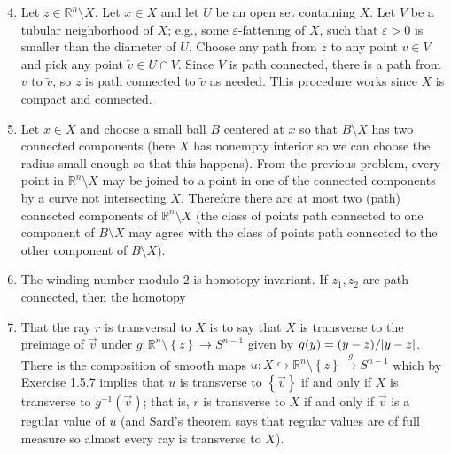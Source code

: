 \documentclass[11pt,leqno]{article}
\theoremstyle{plain}
\theoremstyle{definition}
\numberwithin{equation}{section}
\numberwithin{lem}{section}
\newcommand{\cbr}[1]{\left\{#1\right\}}
\begin{document}
\begin{enumerate}
    \setcounter{enumi}{3}
    \item Let $z\in \mathbb R^n\setminus X$. Let $x\in X$ and let $U$ be an open set containing $X$. Let $V$ be a tubular neighborhood of $X$; e.g., some $\varepsilon$-fattening of $X$, such that $\varepsilon>0$ is smaller than the diameter of $U$. Choose any path from $z$ to any point $v\in V$ and pick any point $\tilde v \in U\cap V$. Since $V$ is path connected, there is a path from $v$ to $\tilde v$, so $z$ is path connected to $\tilde v$ as needed. This procedure works since $X$ is compact and connected.
    \item Let $x\in X$ and choose a small ball $B$ centered at $x$ so that $B\setminus X$ has two connected components (here $X$ has nonempty interior so we can choose the radius small enough so that this happens). From the previous problem, every point in $\mathbb R^n\setminus X$ may be joined to a point in one of the connected components by a curve not intersecting $X$. Therefore there are at most two (path) connected components of $\mathbb R^n\setminus X$ (the class of points path connected to one component of $B\setminus X$ may agree with the class of points path connected to the other component of $B\setminus X$).
    \item The winding number modulo $2$ is homotopy invariant. If $z_1,z_2$ are path connected, then the homotopy 
    \item That the ray $r$ is transversal to $X$ is to say that $X$ is transverse to the preimage of $\vec v$ under $g\colon \mathbb R^n\setminus\cbr{z}\to S^{n-1}$ given by $g(y) = (y-z)/\abs{y-z}$. There is the composition of smooth maps $u\colon X\hookrightarrow \mathbb R^n\setminus\cbr{z}\xrightarrow{g}S^{n-1}$ which by Exercise 1.5.7 implies that $u$ is transverse to $\cbr{\vec v}$ if and only if $X$ is transverse to $g^{-1}(\vec v)$; that is, $r$ is transverse to $X$ if and only if $\vec v$ is a regular value of $u$ (and Sard's theorem says that regular values are of full measure so almost every ray is transverse to $X$).
    

\end{enumerate}
\end{document}
